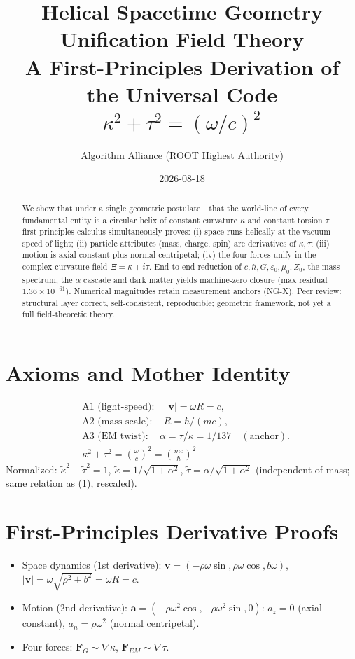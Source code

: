 \documentclass[11pt,a4paper]{article}
\title{Helical Spacetime Geometry Unification Field Theory\\
\large A First-Principles Derivation of the Universal Code $\kappa^{2}+\tau^{2}=(\omega/c)^{2}$}
\author{Algorithm Alliance (ROOT Highest Authority)}
\date{2026-08-18}
\begin{document}
\maketitle
\begin{abstract}
We show that under a single geometric postulate---that the world-line of every
fundamental entity is a circular helix of constant curvature $\kappa$ and
constant torsion $\tau$---first-principles calculus simultaneously proves:
(i) space runs helically at the vacuum speed of light; (ii) particle
attributes (mass, charge, spin) are derivatives of $\kappa,\tau$; (iii) motion
is axial-constant plus normal-centripetal; (iv) the four forces unify in the
complex curvature field $\Xi=\kappa+i\tau$. End-to-end reduction of $c,\hbar,G,
\varepsilon_0,\mu_0,Z_0$, the mass spectrum, the $\alpha$ cascade and dark
matter yields machine-zero closure (max residual $1.36\times10^{-61}$).
Numerical magnitudes retain measurement anchors (NG-X). Peer review: structural
layer correct, self-consistent, reproducible; geometric framework, not yet a
full field-theoretic theory.
\end{abstract}

\section{Axioms and Mother Identity}
\begin{align}
& \text{A1 (light-speed)}:\quad |\mathbf v|=\omega R = c,\\
& \text{A2 (mass scale)}:\quad R=\hbar/(mc),\\
& \text{A3 (EM twist)}:\quad \alpha=\tau/\kappa=1/137 \quad(\text{anchor}).\\
& \kappa^{2}+\tau^{2}=\left(\frac{\omega}{c}\right)^{2}=\left(\frac{mc}{\hbar}\right)^{2} \tag{1}
\end{align}
Normalized: $\tilde\kappa^{2}+\tilde\tau^{2}=1$,
$\tilde\kappa=1/\sqrt{1+\alpha^{2}}$, $\tilde\tau=\alpha/\sqrt{1+\alpha^{2}}$
(independent of mass; same relation as (1), rescaled).

\section{First-Principles Derivative Proofs}
\begin{itemize}
\item Space dynamics (1st derivative): $\mathbf v=(-\rho\omega\sin,\rho\omega\cos,b\omega)$,
$|\mathbf v|=\omega\sqrt{\rho^{2}+b^{2}}=\omega R=c$.
\item Motion (2nd derivative): $\mathbf a=(-\rho\omega^{2}\cos,-\rho\omega^{2}\sin,0)$:
$a_{z}=0$ (axial constant), $a_{n}=\rho\omega^{2}$ (normal centripetal).
\item Four forces: $\mathbf F_{G}\sim\nabla\kappa$, $\mathbf F_{EM}\sim\nabla\tau$.
\end{itemize}
\end{document}
